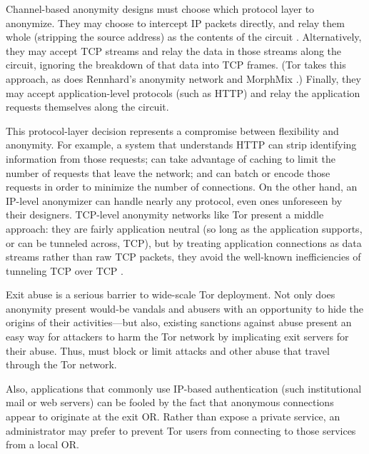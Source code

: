 \documentclass[times,10pt,twocolumn]{article}
\begin{document}

Channel-based anonymity designs must choose which protocol layer to
anonymize.  They may choose to intercept IP packets directly, and relay
them whole (stripping the source address) as the contents of the
circuit \cite{tarzan:ccs02,freedom2-arch}.  Alternatively,
they may
accept TCP streams and relay the data in those streams along the
circuit, ignoring the breakdown of that data into TCP frames. (Tor
takes this approach, as does Rennhard's anonymity network \cite{anonnet}
and MorphMix \cite{morphmix:fc04}.)  Finally, they may accept
application-level protocols (such as HTTP) and relay the application
requests themselves along the circuit.

This protocol-layer decision represents a compromise between flexibility
and anonymity.  For example, a system that understands HTTP can strip
identifying information from those requests; can take advantage of
caching to limit the number of requests that leave the network; and can
batch or encode those requests in order to minimize the number of
connections.  On the other hand, an IP-level anonymizer can handle
nearly any protocol, even ones unforeseen by their designers.  TCP-level
anonymity networks like Tor present a middle approach: they are fairly
application neutral (so long as the application supports, or can be
tunneled across, TCP), but by treating application connections as data
streams rather than raw TCP packets, they avoid the well-known
inefficiencies of tunneling TCP over TCP \cite{tcp-over-tcp-is-bad}.



\label{subsec:exitpolicies}

Exit abuse is a serious barrier to wide-scale Tor deployment.  Not
only does anonymity present would-be vandals and abusers with an
opportunity to hide the origins of their activities---but also,
existing sanctions against abuse present an easy way for attackers to
harm the Tor network by implicating exit servers for their abuse.
Thus, must block or limit attacks and other abuse that travel through
the Tor network.

Also, applications that commonly use IP-based authentication (such
institutional mail or web servers) can be fooled by the fact that
anonymous connections appear to originate at the exit OR.  Rather than
expose a private service, an administrator may prefer to prevent Tor
users from connecting to those services from a local OR.
\end{document}
